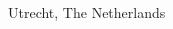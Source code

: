 \begin{titlepage}
    \begin{addmargin}[-1cm]{-3cm}
    \begin{center}
        \large  

        \hfill

        \vfill

        \begingroup
            \color{Maroon}\spacedallcaps{\myTitle} \\ \bigskip
        \endgroup

        \spacedlowsmallcaps{\myName}

        \vfill

        \myUni \\ \bigskip
        {\footnotesize Utrecht, The Netherlands}

        \vfill
        
        {\footnotesize \textcopyright\ \myTime \myName}
    \end{center}  
  \end{addmargin}       
\end{titlepage}   